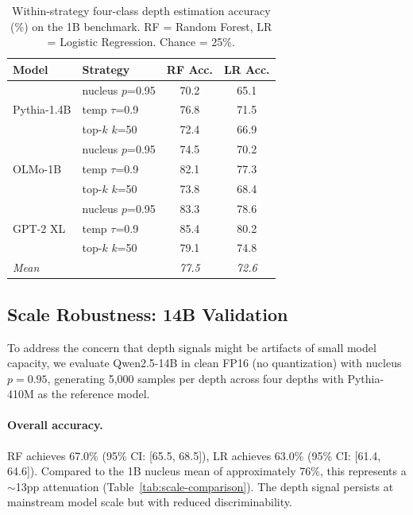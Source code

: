 \documentclass[11pt,a4paper]{article}
\begin{document}
\begin{table}[t]
\centering
\caption{Within-strategy four-class depth estimation accuracy (\%) on the 1B benchmark. RF = Random Forest, LR = Logistic Regression. Chance = 25\%.}
\label{tab:within-strategy}
\begin{tabular}{llcc}
\toprule
\textbf{Model} & \textbf{Strategy} & \textbf{RF Acc.} & \textbf{LR Acc.} \\
\midrule
\multirow{3}{*}{Pythia-1.4B} & nucleus $p$=0.95 & 70.2 & 65.1 \\
 & temp $\tau$=0.9 & 76.8 & 71.5 \\
 & top-$k$ $k$=50 & 72.4 & 66.9 \\
\midrule
\multirow{3}{*}{OLMo-1B} & nucleus $p$=0.95 & 74.5 & 70.2 \\
 & temp $\tau$=0.9 & 82.1 & 77.3 \\
 & top-$k$ $k$=50 & 73.8 & 68.4 \\
\midrule
\multirow{3}{*}{GPT-2 XL} & nucleus $p$=0.95 & 83.3 & 78.6 \\
 & temp $\tau$=0.9 & 85.4 & 80.2 \\
 & top-$k$ $k$=50 & 79.1 & 74.8 \\
\midrule
\multicolumn{2}{l}{\textit{Mean}} & \textit{77.5} & \textit{72.6} \\
\bottomrule
\end{tabular}
\end{table}

\subsection{Scale Robustness: 14B Validation}
\label{sec:scale}

To address the concern that depth signals might be artifacts of small model capacity, we evaluate Qwen2.5-14B in clean FP16 (no quantization) with nucleus $p = 0.95$, generating 5{,}000 samples per depth across four depths with Pythia-410M as the reference model.

\paragraph{Overall accuracy.} RF achieves 67.0\% (95\% CI: [65.5, 68.5]), LR achieves 63.0\% (95\% CI: [61.4, 64.6]). Compared to the 1B nucleus mean of approximately 76\%, this represents a $\sim$13pp attenuation (Table~\ref{tab:scale-comparison}). The depth signal persists at mainstream model scale but with reduced discriminability.
\end{document}
